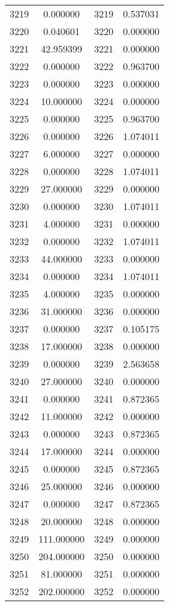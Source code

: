 \documentclass[12pt]{article}
\begin{document}
\begin{longtable}{@{}cccc@{}}
3219 & 0.000000 & 3219 & 0.537031 \\
3220 & 0.040601 & 3220 & 0.000000 \\
3221 & 42.959399 & 3221 & 0.000000 \\
3222 & 0.000000 & 3222 & 0.963700 \\
3223 & 0.000000 & 3223 & 0.000000 \\
3224 & 10.000000 & 3224 & 0.000000 \\
3225 & 0.000000 & 3225 & 0.963700 \\
3226 & 0.000000 & 3226 & 1.074011 \\
3227 & 6.000000 & 3227 & 0.000000 \\
3228 & 0.000000 & 3228 & 1.074011 \\
3229 & 27.000000 & 3229 & 0.000000 \\
3230 & 0.000000 & 3230 & 1.074011 \\
3231 & 4.000000 & 3231 & 0.000000 \\
3232 & 0.000000 & 3232 & 1.074011 \\
3233 & 44.000000 & 3233 & 0.000000 \\
3234 & 0.000000 & 3234 & 1.074011 \\
3235 & 4.000000 & 3235 & 0.000000 \\
3236 & 31.000000 & 3236 & 0.000000 \\
3237 & 0.000000 & 3237 & 0.105175 \\
3238 & 17.000000 & 3238 & 0.000000 \\
3239 & 0.000000 & 3239 & 2.563658 \\
3240 & 27.000000 & 3240 & 0.000000 \\
3241 & 0.000000 & 3241 & 0.872365 \\
3242 & 11.000000 & 3242 & 0.000000 \\
3243 & 0.000000 & 3243 & 0.872365 \\
3244 & 17.000000 & 3244 & 0.000000 \\
3245 & 0.000000 & 3245 & 0.872365 \\
3246 & 25.000000 & 3246 & 0.000000 \\
3247 & 0.000000 & 3247 & 0.872365 \\
3248 & 20.000000 & 3248 & 0.000000 \\
3249 & 111.000000 & 3249 & 0.000000 \\
3250 & 204.000000 & 3250 & 0.000000 \\
3251 & 81.000000 & 3251 & 0.000000 \\
3252 & 202.000000 & 3252 & 0.000000 \\

\end{longtable}
\end{document}

